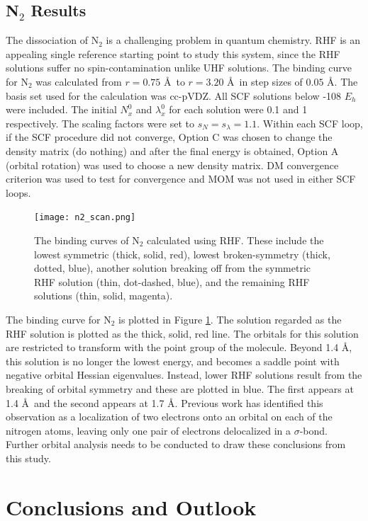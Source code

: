 \documentclass[final,3p,times,twocolumn]{elsarticle}
\begin{document}
\subsection{N$_2$ Results}
The dissociation of N$_2$ is a challenging problem in quantum chemistry. RHF is an appealing single reference starting point to study this system, since the RHF solutions suffer no spin-contamination unlike UHF solutions. The binding curve for N$_2$ was calculated from $r = 0.75$ \AA\ to $r = 3.20$ \AA\ in step sizes of $0.05$ \AA. The basis set used for the calculation was cc-pVDZ\cite{dunning}. All SCF solutions below -108 $E_h$ were included. The initial $N_x^0$ and $\lambda_x^0$ for each solution were 0.1 and 1 respectively. The scaling factors were set to $s_N = s_\lambda = 1.1$. Within each SCF loop, if the SCF procedure did not converge, Option C was chosen to change the density matrix (do nothing) and after the final energy is obtained, Option A (orbital rotation) was used to choose a new density matrix. DM convergence criterion was used to test for convergence and MOM was not used in either SCF loops.

\begin{figure}
\texttt{[image: n2\_scan.png]}
\caption{The binding curves of N$_2$ calculated using RHF. These include the lowest symmetric (thick, solid, red), lowest broken-symmetry (thick, dotted, blue), another solution breaking off from the symmetric RHF solution (thin, dot-dashed, blue), and the remaining RHF solutions (thin, solid, magenta).}
\label{fig:n2plot}
\end{figure}

The binding curve for N$_2$ is plotted in Figure \ref{fig:n2plot}. The solution regarded as the RHF solution is plotted as the thick, solid, red line. The orbitals for this solution are restricted to transform with the point group of the molecule. Beyond 1.4 \AA, this solution is no longer the lowest energy, and becomes a saddle point with negative orbital Hessian eigenvalues.\cite{scfmd} Instead, lower RHF solutions result from the breaking of orbital symmetry and these are plotted in blue. The first appears at 1.4 \AA\ and the second appears at 1.7 \AA. Previous work has identified this observation as a localization of two electrons onto an orbital on each of the nitrogen atoms, leaving only one pair of electrons delocalized in a $\sigma$-bond.\cite{scfmd} Further orbital analysis needs to be conducted to draw these conclusions from this study.

\section{Conclusions and Outlook}
\label{sect:Concl}
\end{document}
